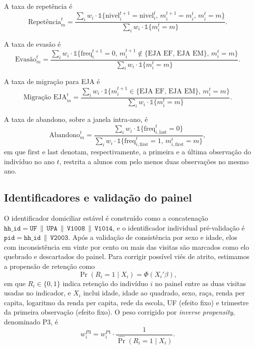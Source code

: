 A taxa de repetência é
\[
\text{Repetência}_m^t = \frac{\sum_i w_i \cdot \mathbb{1}\{\text{nivel}_i^{t+1} = \text{nivel}_i^t,\, m_i^{t+1} = m_i^t,\, m_i^t = m\}}
{\sum_i w_i \cdot \mathbb{1}\{m_i^t = m\}}.
\]

A taxa de evasão é
\[
\text{Evasão}_m^t = \frac{\sum_i w_i \cdot \mathbb{1}\{\text{freq}_i^{t+1} = 0,\, m_i^{t+1} \notin \{\text{EJA EF, EJA EM}\},\, m_i^t = m\}}
{\sum_i w_i \cdot \mathbb{1}\{m_i^t = m\}}.
\]

A taxa de migração para EJA é
\[
\text{Migração EJA}_m^t = \frac{\sum_i w_i \cdot \mathbb{1}\{m_i^{t+1} \in \{\text{EJA EF, EJA EM}\},\, m_i^t = m\}}
{\sum_i w_i \cdot \mathbb{1}\{m_i^t = m\}}.
\]

A taxa de abandono, sobre a janela intra-ano, é
\[
\text{Abandono}_m^t = \frac{\sum_i w_i \cdot \mathbb{1}\{\text{freq}_{i,\text{last}}^t = 0\}}
{\sum_i w_i \cdot \mathbb{1}\{\text{freq}_{i,\text{first}}^t = 1,\, m_{i,\text{first}}^t = m\}},
\]
em que $\text{first}$ e $\text{last}$ denotam, respectivamente, a
primeira e a última observação do indivíduo no ano $t$, restrita a
alunos com pelo menos duas observações no mesmo ano.

\subsection*{Identificadores e validação do painel}

O identificador domiciliar estável é construído como a concatenação
$\texttt{hh\_id} = \texttt{UF} \,\|\, \texttt{UPA} \,\|\, \texttt{V1008} \,\|\, \texttt{V1014}$,
e o identificador individual pré-validação é
$\texttt{pid} = \texttt{hh\_id} \,\|\, \texttt{V2003}$. Após a
validação de consistência por sexo e idade, elos com inconsistência
em vinte por cento ou mais das visitas são marcados como elo
quebrado e descartados do painel. Para corrigir possível viés de
atrito, estimamos a propensão de retenção como
\[
\Pr(R_i = 1 \mid X_i) = \Phi(X_i' \beta),
\]
em que $R_i \in \{0,1\}$ indica retenção do indivíduo $i$ no painel
entre as duas visitas usadas no indicador, e $X_i$ inclui idade,
idade ao quadrado, sexo, raça, renda per capita, logaritmo da renda
per capita, rede da escola, UF (efeito fixo) e trimestre da primeira
observação (efeito fixo). O peso corrigido por \emph{inverse
propensity}, denominado P3, é
\[
w_i^{P3} = w_i^{P1} \cdot \frac{1}{\hat\Pr(R_i=1 \mid X_i)}.
\]

